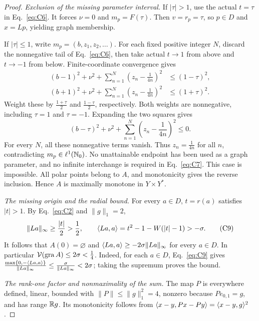 \begin{proof}
\noindent\textit{Exclusion of the missing parameter interval.}
\label{sec:C4}
If $|\tau|>1$, use the actual $t=\tau$ in Eq.~\eqref{eq:C6}. It forces
$\nu=0$ and $m_p=F(\tau)$. Then $v=r_p=\tau$, so $p\in D$ and $x=Lp$,
yielding graph membership.

If $|\tau|\le1$, write $m_p=(b,z_1,z_2,\ldots)$. For each fixed positive
integer $N$, discard the nonnegative tail of Eq.~\eqref{eq:C6}, then
take actual $t\to1$ from above and $t\to-1$ from below.
Finite-coordinate convergence gives
\begin{equation}
\begin{aligned}
(b-1)^2+\nu^2+\sum_{n=1}^N(z_n-\frac{1}{4n})^2&\le(1-\tau)^2,\\
(b+1)^2+\nu^2+\sum_{n=1}^N(z_n-\frac{1}{4n})^2&\le(1+\tau)^2.
\end{aligned}
\tag{C7}\label{eq:C7}
\end{equation}
Weight these by $\frac{1+\tau}{2}$ and $\frac{1-\tau}{2}$, respectively. Both
weights are nonnegative, including $\tau=1$ and $\tau=-1$. Expanding
the two squares gives
\begin{equation}
(b-\tau)^2+\nu^2+\sum_{n=1}^N(z_n-\frac{1}{4n})^2\le0.
\tag{C8}\label{eq:C8}
\end{equation}
For every $N$, all these nonnegative terms vanish. Thus $z_n=\frac{1}{4n}$ for
all $n$, contradicting $m_p\in\ell^1(\mathbb N_0)$. No unattainable endpoint
has been used as a graph parameter, and no infinite interchange is required in
Eq.~\eqref{eq:C7}. This case is impossible. All polar points belong to
$A$, and monotonicity gives the reverse inclusion. Hence $A$ is maximally
monotone in $Y\times Y^*$.

\noindent\textit{The missing origin and the radial bound.}
\label{sec:C5}
For every $a\in D$, $t=r(a)$ satisfies $|t|>1$. By Eq.~\eqref{eq:C2}
and $\|g\|_1=2$,
\begin{equation}
\|La\|_\infty\ge\frac{|t|}{2}>\frac{1}{2},\qquad
\langle La,a\rangle=t^2-1-W(|t|-1)>-\sigma.
\tag{C9}\label{eq:C9}
\end{equation}
It follows that $A(0)=\varnothing$ and
$\langle La,a\rangle\ge-2\sigma\|La\|_\infty$ for every $a\in D$.
In particular $\mathcal V(\operatorname{gra} A)\le2\sigma<\frac{1}{4}$.
Indeed, for each $a\in D$, Eq.~\eqref{eq:C9} gives
$\frac{\max\{0,-\langle La,a\rangle\}}{\|La\|_\infty}
\le\frac{\sigma}{\|La\|_\infty}<2\sigma$; taking the supremum proves the bound.

\noindent\textit{The rank-one factor and nonmaximality of the sum.}
\label{sec:C6}
The map $P$ is everywhere defined, linear, bounded with
$\|P\|\le\|g\|_1^2=4$, nonzero because $Pe_{0,1}=g$, and has range $\mathbb R g$.
Its monotonicity follows from $\langle x-y,Px-Py\rangle=\langle x-y,g\rangle^2$.


\end{proof}
